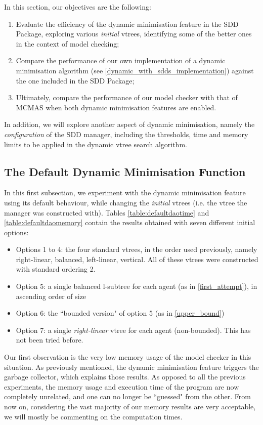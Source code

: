 \documentclass[11pt]{report}
\begin{document}
In this section, our objectives are the following:
\begin{enumerate}
\item Evaluate the efficiency of the dynamic minimisation feature in the  SDD Package, exploring various \textit{initial} vtrees, identifying some of the better ones in the context of model checking; 
\item Compare the performance of our own implementation of a dynamic minimisation algorithm (see \ref{dynamic_with_sdds_implementation}) against the one included in the SDD Package;
\item Ultimately, compare the performance of our model checker with that of MCMAS when both dynamic minimisation features are enabled.
\end{enumerate}
In addition, we will explore another aspect of dynamic minimisation, namely the \textit{configuration} of the SDD manager, including the thresholds, time and memory limits to be applied in the dynamic vtree search algorithm. 

\subsection{The Default Dynamic Minimisation Function}

In this first subsection, we experiment with the dynamic minimisation feature using its default behaviour, while changing the \textit{initial }vtrees (i.e. the vtree the manager was constructed with). Tables \ref{table:defaultdaotime} and \ref{table:defaultdaomemory} contain the results obtained with seven different initial options: \begin{itemize}
\item Options 1 to 4: the four standard vtrees, in the order used previously, namely right-linear, balanced, left-linear, vertical. All of these vtrees were constructed with standard ordering 2.
\item Option 5: a single balanced l-subtree for each agent (as in \ref{first_attempt}), in ascending order of size
\item Option 6: the ``bounded version" of option 5 (as in \ref{upper_bound})
\item Option 7: a single \textit{right-linear} vtree for each agent (non-bounded). This has not been tried before.
\end{itemize}
Our first observation is the very low memory usage of the model checker in this situation. As previously mentioned, the dynamic minimisation feature triggers the garbage collector, which explains those results. As opposed to all the previous experiments, the memory usage and execution time of the program are now completely unrelated, and one can no longer be ``guessed" from the other. From now on, considering the vast majority of our memory results are very acceptable, we will mostly be commenting on the computation times.
\end{document}
